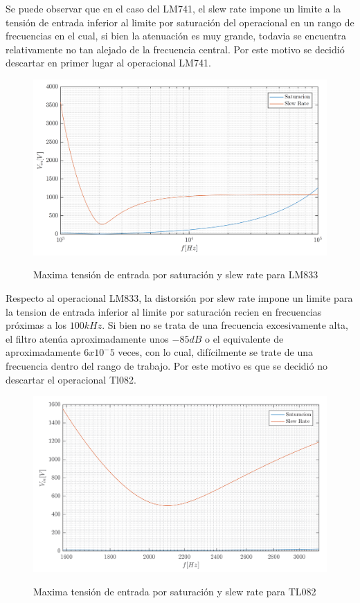 Se puede observar que en el caso del LM741, el slew rate impone un limite a la tensión de entrada inferior al limite por saturación del operacional en un rango de frecuencias en el cual, si bien la atenuación es muy grande, todavia se encuentra relativamente no tan alejado de la frecuencia central. Por este motivo se decidió descartar en primer lugar al operacional LM741.

\begin{figure}[H]
\centering
\includegraphics[scale=0.4]{../parte1/informe/resources/vin_max_LM833}
\label{1_vin_max_LM833}
\caption{Maxima tensión de entrada por saturación y slew rate para LM833}
\end{figure}

Respecto al operacional LM833, la distorsión por slew rate impone un limite para la tension de entrada inferior al limite por saturación recien en frecuencias próximas a los $100 kHz$. Si bien no se trata de una frecuencia excesivamente alta, el filtro atenúa aproximadamente unos $-85 dB$ o el equivalente de aproximadamente $6x10^-5$ veces, con lo cual, difícilmente se trate de una frecuencia dentro del rango de trabajo. Por este motivo es que se decidió no descartar el operacional Tl082.

\begin{figure}[H]
\centering
\includegraphics[scale=0.4]{../parte1/informe/resources/vin_max_TL082}
\label{1_vin_max_TL082}
\caption{Maxima tensión de entrada por saturación y slew rate para TL082}
\end{figure}

